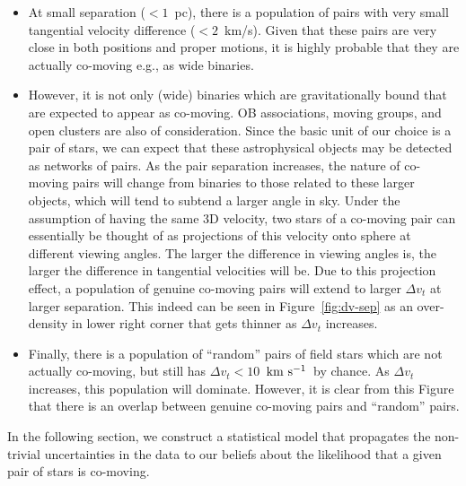 \documentclass[manuscript, letterpaper]{aastex6}
\newcommand{\kms}{\ensuremath{\rm km~s^{-1}}}
\begin{document}
\begin{itemize}
  \item At small separation ($<1$~pc), there is a population of pairs with
  very small tangential velocity difference ($<2$~km/s). Given that these pairs
  are very close in both positions and proper motions,
  it is highly probable that they are actually co-moving e.g., as wide binaries.
  
  \item  However, it is not only (wide) binaries which are gravitationally
  bound that are expected to appear as co-moving.
  OB associations, moving groups, and open clusters are also of consideration.
  Since the basic unit of our choice is a pair of stars, we can expect that these astrophysical objects may be detected as networks of pairs.
  As the pair separation increases, the nature of co-moving pairs
  will change from binaries to those related to these larger objects,
  which will tend to subtend a larger angle in sky.
  Under the assumption of having the same 3D velocity,
  two stars of a co-moving pair can essentially be thought of as projections
  of this velocity onto sphere at different viewing angles.
  The larger the difference in viewing angles is, the larger the difference in tangential 
  velocities will be.
  Due to this projection effect, a population of genuine co-moving pairs
  will extend to larger $\Delta v_t$ at larger separation.
  This indeed can be seen in Figure~\ref{fig:dv-sep} as an over-density
  in lower right corner that gets thinner as $\Delta v_t$ increases.
  
  \item Finally, there is a population of “random” pairs of field stars
  which are not actually co-moving, but still has $\Delta v_t < 10$~\kms\
  by chance.
  As $\Delta v_t$ increases, this population will dominate.
  However, it is clear from this Figure that there is an overlap between
  genuine co-moving pairs and “random” pairs.
\end{itemize}

In the following section, we construct a statistical model that propagates
the non-trivial uncertainties in the data to our beliefs about the likelihood
that a given pair of stars is co-moving.
\end{document}
